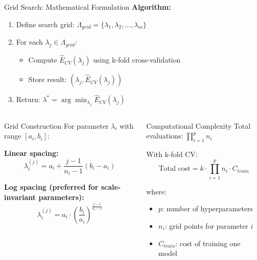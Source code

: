 \documentclass[8pt,aspectratio=1610]{beamer}
\begin{document}
\begin{frame}{Grid Search: Mathematical Formulation}
\textbf{Algorithm:}
\begin{enumerate}
\setlength{\itemsep}{3pt}
\item Define search grid: $\Lambda_{grid} = \{\lambda_1, \lambda_2, \ldots, \lambda_m\}$
\item For each $\lambda_j \in \Lambda_{grid}$:
\begin{itemize}
\item Compute $\hat{E}_{CV}(\lambda_j)$ using k-fold cross-validation
\item Store result: $(\lambda_j, \hat{E}_{CV}(\lambda_j))$
\end{itemize}
\item Return: $\lambda^* = \arg\min_{\lambda_j} \hat{E}_{CV}(\lambda_j)$
\end{enumerate}

\vspace{0.3cm}

\begin{columns}[t]
\begin{column}{0.48\textwidth}
\begin{block}{Grid Construction}
For parameter $\lambda_i$ with range $[a_i, b_i]$:

\textbf{Linear spacing:}
$$\lambda_i^{(j)} = a_i + \frac{j-1}{n_i-1}(b_i - a_i)$$

\textbf{Log spacing (preferred for scale-invariant parameters):}
$$\lambda_i^{(j)} = a_i \cdot \left(\frac{b_i}{a_i}\right)^{\frac{j-1}{n_i-1}}$$
\end{block}
\end{column}

\begin{column}{0.48\textwidth}
\begin{block}{Computational Complexity}
Total evaluations: $\prod_{i=1}^p n_i$

With k-fold CV:
$$\text{Total cost} = k \cdot \prod_{i=1}^p n_i \cdot C_{train}$$

where:
\begin{itemize}
\item $p$: number of hyperparameters
\item $n_i$: grid points for parameter $i$
\item $C_{train}$: cost of training one model
\end{itemize}
\end{block}
\end{column}
\end{columns}
\end{frame}
\end{document}
